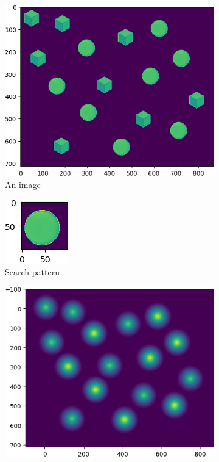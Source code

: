 \begin{figure}[b!]
	\centering
		\begin{subfigure}{.49\textwidth}
		\centering
		\includegraphics[width=\linewidth]{img/shapes}
		\caption{An image}
	\end{subfigure}
	\begin{subfigure}{.49\textwidth}
	\centering
	\includegraphics[width=0.4\linewidth]{img/shapes_pattern}
	\caption{Search pattern}
	\end{subfigure}
	\begin{subfigure}{.5\textwidth}
		\centering
		\includegraphics[width=\linewidth]{img/shapes_correlated}

\end{subfigure}
\end{figure}

